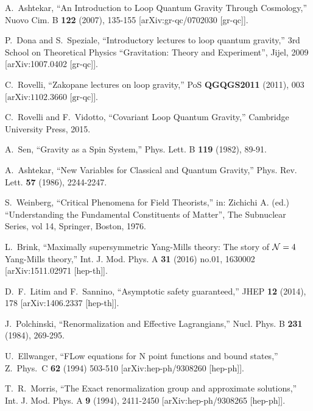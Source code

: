\documentclass[12pt]{article}
\numberwithin{equation}{section}
\begin{document}
\begin{thebibliography}{999}
A.~Ashtekar,
``An Introduction to Loop Quantum Gravity Through Cosmology,''
Nuovo Cim. B \textbf{122} (2007), 135-155
[arXiv:gr-qc/0702030 [gr-qc]].

P.~Dona and S.~Speziale,
``Introductory lectures to loop quantum gravity,'' 3rd School on Theoretical Physics ``Gravitation: Theory and Experiment'', Jijel, 2009 [arXiv:1007.0402 [gr-qc]].

C.~Rovelli,
``Zakopane lectures on loop gravity,''
PoS \textbf{QGQGS2011} (2011), 003 \\
$\mbox{[arXiv:1102.3660 [gr-qc]]}$.

C.~Rovelli and F.~Vidotto,
``Covariant Loop Quantum Gravity,'' Cambridge University Press, 2015.

A.~Sen,
``Gravity as a Spin System,''
Phys. Lett. B \textbf{119} (1982), 89-91.

A.~Ashtekar,
``New Variables for Classical and Quantum Gravity,''
Phys. Rev. Lett. \textbf{57} (1986), 2244-2247.

S.~Weinberg,
``Critical Phenomena for Field Theorists,'' in: Zichichi A. (ed.) ``Understanding the Fundamental Constituents of Matter'', The Subnuclear Series, vol 14, Springer, Boston, 1976.

L.~Brink,
``Maximally supersymmetric Yang-Mills theory: The story of ${\cal N}= 4$ Yang-Mills theory,''
Int. J. Mod. Phys. A \textbf{31} (2016) no.01, 1630002
[arXiv:1511.02971 [hep-th]].

D.~F.~Litim and F.~Sannino,
``Asymptotic safety guaranteed,''
JHEP \textbf{12} (2014), 178
[arXiv:1406.2337 [hep-th]].

J.~Polchinski,
``Renormalization and Effective Lagrangians,''
Nucl. Phys. B \textbf{231} (1984), 269-295.

U.~Ellwanger,
``FLow equations for N point functions and bound states,''
Z.~Phys.~C {\bf 62} (1994) 503-510 
[arXiv:hep-ph/9308260 [hep-ph]].

T.~R.~Morris,
``The Exact renormalization group and approximate solutions,''
Int. J. Mod. Phys. A \textbf{9} (1994), 2411-2450
[arXiv:hep-ph/9308265 [hep-ph]].


\end{thebibliography}
\end{document}
